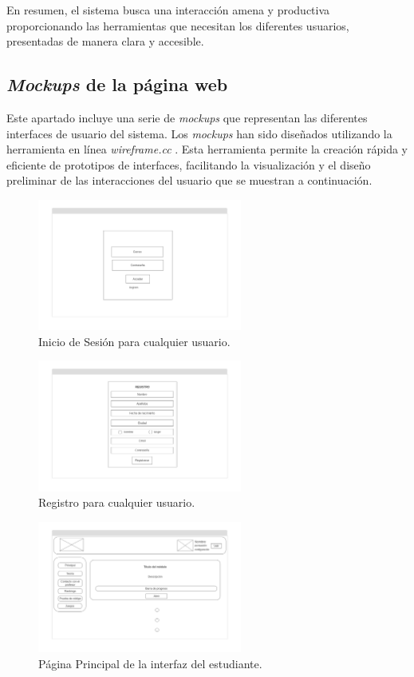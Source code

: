 En resumen, el sistema busca una interacción amena y productiva proporcionando las herramientas que necesitan los diferentes usuarios, presentadas de manera clara y accesible.

\subsection{\textit{Mockups} de la página web}

Este apartado incluye una serie de \textit{mockups} que representan las diferentes interfaces de usuario del sistema. Los \textit{mockups} han sido diseñados utilizando la herramienta en línea \textit{wireframe.cc} \cite{wireframe}. Esta herramienta permite la creación rápida y eficiente de prototipos de interfaces, facilitando la visualización y el diseño preliminar de las interacciones del usuario que se muestran a continuación.

\begin{figure}[H]
    \centering
    \includegraphics[width=0.6\textwidth]{imagenes/Mockups/1-InicioDeSesion.png}
    \caption{Inicio de Sesión para cualquier usuario.}
\end{figure}

\begin{figure}[H]
    \centering
    \includegraphics[width=0.6\textwidth]{imagenes/Mockups/2-Registro.png}
    \caption{Registro para cualquier usuario.}
\end{figure}

\begin{figure}[H]
    \centering
    \includegraphics[width=0.6\textwidth]{imagenes/Mockups/3-Pag-Principal.png}
    \caption{Página Principal  de la interfaz del estudiante.}
\end{figure}

